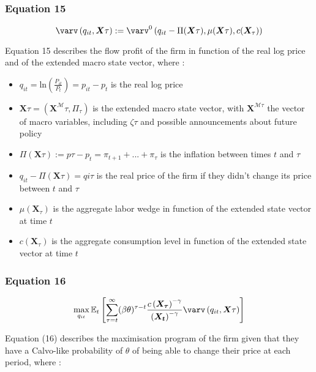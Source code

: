 \documentclass{article}
\begin{document}
\subsubsection*{Equation 15}
\begin{equation}
    \varv\left(q_{it},\bm{X}{\tau}\right):=\varv^{0}\left(q_{it}-\Pi(\bm{X}{\tau}),\mu(\bm{X}{\tau}),c(\bm{X}_{\tau})\right)
\end{equation}

Equation 15 describes the flow profit of the firm in function of the real log price and of the extended macro state vector, where : 
\begin{itemize}
    \item $q_{it}=\text{ln}\left(\frac{P_{it}}{P_{t}}\right)=p_{it}-p_{t}$ is the real log price
    \item $\bm{X}{\tau}=(\bm{X}^{\mathcal{M}}{\tau}, \Pi_{\tau})$ is the extended macro state vector, with $\bm{X}^{\mathcal{M}{\tau}}$ the vector of macro variables, including $\zeta{\tau}$ and possible announcements about future policy
    \item $\Pi\left(\bm{X}{\tau}\right):=p{\tau}-p_{t}=\pi_{t+1}+...+\pi_{\tau}$ is the inflation between times $t$ and $\tau$
    \item $q_{it}-\Pi(\bm{X}{\tau})=q{i\tau}$ is the real price of the firm if they didn't change its price between $t$ and $\tau$
    \item $\mu\left(\bm{X}_{\tau}\right)$ is the aggregate labor wedge in function of the extended state vector at time $t$
    \item $c(\bm{X}_{\tau})$ is the aggregate consumption level in function of the extended state vector at time $t$
\end{itemize}

\subsubsection*{Equation 16}
\begin{equation}
    \max_{q_{it}} \mathbb{E}_{t}\left[\sum_{\tau=t}^{\infty}(\beta\theta)^{\tau-t} \frac{c\left(\bm{X_{\tau}}\right)^{-\gamma}}{\left(\bm{X_{t}}\right)^{-\gamma}} \varv\left(q_{it},\bm{X}{\tau}\right)\right]
\end{equation}

Equation (16) describes the maximisation program of the firm given that they have a Calvo-like probability of $\theta$ of being able to change their price at each period, where : 
\end{document}
